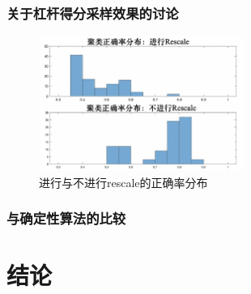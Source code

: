 \documentclass{ctexart}
\begin{document}
    \subsubsection{关于杠杆得分采样效果的讨论}
        \begin{figure}
            \centering
            \includegraphics[width=0.6\textwidth]{result/nipscmp.png}
            \caption{进行与不进行rescale的正确率分布}
        \end{figure}


    \subsubsection{与确定性算法的比较}

    \section{结论}

\nocite{*} %


\end{document}
